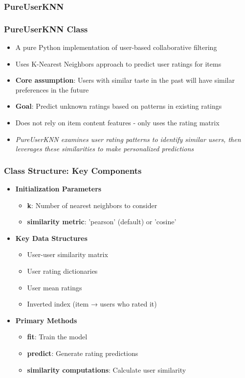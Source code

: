 \documentclass{beamer}
\begin{document}
\subsubsection{PureUserKNN}
\begin{frame}
\frametitle{PureUserKNN Class}

\begin{itemize}
    \item A pure Python implementation of user-based collaborative filtering
    \item Uses K-Nearest Neighbors approach to predict user ratings for items
    \item \textbf{Core assumption}: Users with similar taste in the past will have similar preferences in the future
    \item \textbf{Goal}: Predict unknown ratings based on patterns in existing ratings
    \item Does not rely on item content features - only uses the rating matrix

    \vspace{1cm}
    
    \item \textit{PureUserKNN examines user rating patterns to identify similar users,
then leverages these similarities to make personalized predictions}
\end{itemize}
\end{frame}

\begin{frame}
\frametitle{Class Structure: Key Components}

\begin{itemize}
    \item \textbf{Initialization Parameters}
    \begin{itemize}
        \item \textbf{k}: Number of nearest neighbors to consider
        \item \textbf{similarity metric}: 'pearson' (default) or 'cosine'
    \end{itemize}
    
    \item \textbf{Key Data Structures}
    \begin{itemize}
        \item User-user similarity matrix
        \item User rating dictionaries
        \item User mean ratings
        \item Inverted index (item → users who rated it)
    \end{itemize}
    
    \item \textbf{Primary Methods}
    \begin{itemize}
        \item \textbf{fit}: Train the model
        \item \textbf{predict}: Generate rating predictions
        \item \textbf{similarity computations}: Calculate user similarity
    \end{itemize}
\end{itemize}
\end{frame}
\end{document}

